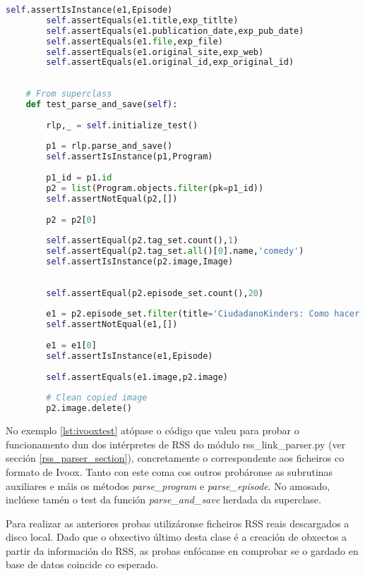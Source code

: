 \begin{lstlisting}[language=Python, caption=Probas de unidade dos metodos de ParserIvoox, label=lst:ivooxtest]
		self.assertIsInstance(e1,Episode)
		self.assertEquals(e1.title,exp_titlte)
		self.assertEquals(e1.publication_date,exp_pub_date)
		self.assertEquals(e1.file,exp_file)
		self.assertEquals(e1.original_site,exp_web)
		self.assertEquals(e1.original_id,exp_original_id)
	
	
	# From superclass
	def test_parse_and_save(self):
		
		rlp,_ = self.initialize_test()
		
		p1 = rlp.parse_and_save()
		self.assertIsInstance(p1,Program)
		
		p1_id = p1.id
		p2 = list(Program.objects.filter(pk=p1_id))
		self.assertNotEqual(p2,[])
		
		p2 = p2[0]
		
		self.assertEqual(p2.tag_set.count(),1)
		self.assertEqual(p2.tag_set.all()[0].name,'comedy')
		self.assertIsInstance(p2.image,Image)
		
		
		self.assertEqual(p2.episode_set.count(),20)
		
		e1 = p2.episode_set.filter(title='CiudadanoKinders: Como hacer un monologo')
		self.assertNotEqual(e1,[])
		
		e1 = e1[0]
		self.assertIsInstance(e1,Episode)
		
		self.assertEquals(e1.image,p2.image)
		
		# Clean copied image
		p2.image.delete()
\end{lstlisting}   

No exemplo \ref{lst:ivooxtest} atópase o código que valeu para probar o funcionamento dun dos intérpretes de RSS do módulo rss\_link\_parser.py (ver sección \ref{rss_parser_section}), concretamente o correspondente aos ficheiros co formato de Ivoox.  Tanto con este coma cos outros  probáronse as subrutinas auxiliares e máis os métodos \textit{parse\_program} e \textit{parse\_episode}. No amosado, inclúese tamén o test da función \textit{parse\_and\_save} herdada da superclase.

Para realizar as anteriores probas utilizáronse ficheiros RSS reais descargados a disco local. Dado que o obxectivo último desta clase é a creación de obxectos a partir da información do RSS, as probas enfócanse en comprobar se o gardado en base de datos coincide co esperado.


